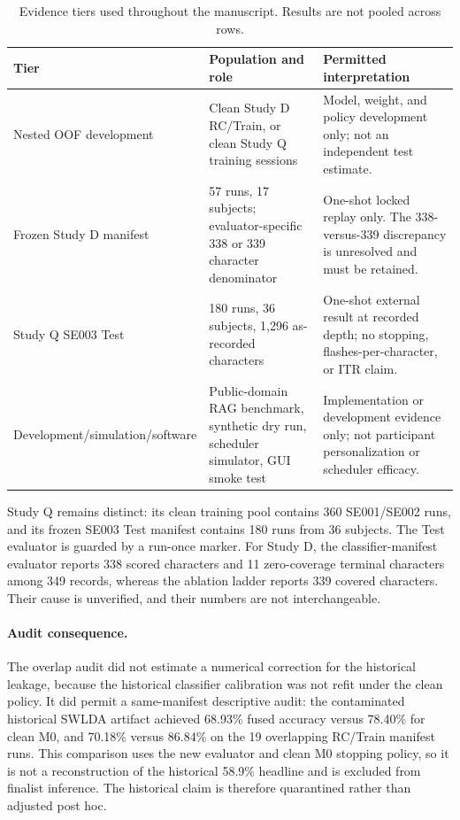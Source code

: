 \documentclass[final,5p,times,twocolumn,authoryear]{elsarticle}
\begin{document}
\begin{table}[t]
\centering\small
\caption{Evidence tiers used throughout the manuscript. Results are not pooled across rows.}\label{tab:evidence-tiers}
\begin{tabular}{p{}p{}p{}}
\toprule
Tier & Population and role & Permitted interpretation \\
\midrule
Nested OOF development & Clean Study D RC/Train, or clean Study Q training sessions & Model, weight, and policy development only; not an independent test estimate.\\
Frozen Study D manifest & 57 runs, 17 subjects; evaluator-specific 338 or 339 character denominator & One-shot locked replay only. The 338-versus-339 discrepancy is unresolved and must be retained.\\
Study Q SE003 Test & 180 runs, 36 subjects, 1,296 as-recorded characters & One-shot external result at recorded depth; no stopping, flashes-per-character, or ITR claim.\\
Development/simulation/software & Public-domain RAG benchmark, synthetic dry run, scheduler simulator, GUI smoke test & Implementation or development evidence only; not participant personalization or scheduler efficacy.\\
\bottomrule
\end{tabular}
\end{table}

Study Q remains distinct: its clean training pool contains 360 SE001/SE002 runs, and its frozen SE003 Test manifest contains 180 runs from 36 subjects. The Test evaluator is guarded by a run-once marker. For Study D, the classifier-manifest evaluator reports 338 scored characters and 11 zero-coverage terminal characters among 349 records, whereas the ablation ladder reports 339 covered characters. Their cause is unverified, and their numbers are not interchangeable.

\paragraph{Audit consequence.} The overlap audit did not estimate a numerical correction for the historical leakage, because the historical classifier calibration was not refit under the clean policy. It did permit a same-manifest descriptive audit: the contaminated historical SWLDA artifact achieved 68.93\% fused accuracy versus 78.40\% for clean M0, and 70.18\% versus 86.84\% on the 19 overlapping RC/Train manifest runs. This comparison uses the new evaluator and clean M0 stopping policy, so it is not a reconstruction of the historical 58.9\% headline and is excluded from finalist inference. The historical claim is therefore quarantined rather than adjusted post hoc.
\end{document}

